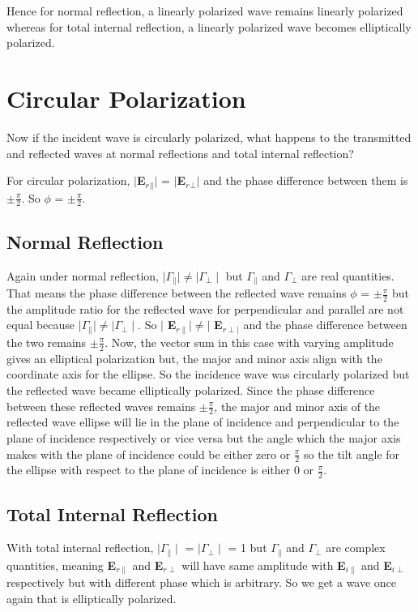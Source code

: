 Hence for normal reflection, a linearly polarized wave remains linearly polarized whereas for total internal reflection, a linearly polarized wave becomes elliptically polarized.

\section{Circular Polarization}
Now if the incident wave is circularly polarized, what happens to the transmitted and reflected waves at normal reflections and total internal reflection?

For circular polarization, $\mid$\textbf{E$_r$$_\parallel$}$\mid$ = $\mid$\textbf{E$_r$$_\perp$}$\mid$ and the phase difference between them is $\pm\frac{\pi}{2}$. So $\phi$ = $\pm\frac{\pi}{2}$.

\subsection{Normal Reflection}
Again under  normal reflection, $\mid\Gamma_\parallel\mid \neq \mid\Gamma_\perp\mid$ but $\Gamma_\parallel$ and $\Gamma_\perp$ are real quantities. That means the phase difference between the reflected wave remains $\phi$ = $\pm\frac{\pi}{2}$ but the amplitude ratio for the reflected wave for perpendicular and parallel are not equal because $\mid\Gamma_\parallel\mid \neq \mid \Gamma_\perp \mid$. So $\mid$ \textbf{E}$_{r\parallel} \mid \neq \mid$ \textbf{E}$_{r\perp\mid}$ and the phase difference between the two remains $\pm\frac{\pi}{2}$. Now, the vector sum in this case with varying amplitude gives an elliptical polarization but, the major and minor axis align with the coordinate axis for the ellipse. So the incidence wave was circularly polarized but the reflected wave became elliptically polarized. Since the phase difference between these reflected waves remains $\pm\frac{\pi}{2}$, the major and minor axis of the reflected wave ellipse will lie in the plane of incidence and perpendicular to the plane of incidence respectively or vice versa but the angle which the major axis makes with the plane of incidence could be either zero or $\frac{\pi}{2}$ so the tilt angle for the ellipse with respect to the plane of incidence is either 0 or $\frac{\pi}{2}$.

\subsection{Total Internal Reflection}
With total internal reflection, $\mid\Gamma_\parallel\mid$ = $\mid\Gamma_\perp\mid$ = 1 but $\Gamma_\parallel$ and $\Gamma_\perp$ are complex quantities, meaning
\textbf{E}$_{r\parallel}$ and \textbf{E}$_{r\perp}$ will have same amplitude with \textbf{E}$_{i\parallel}$ and \textbf{E}$_{i\perp}$ respectively but with different phase which is arbitrary. So we get a wave once again that is elliptically polarized.


